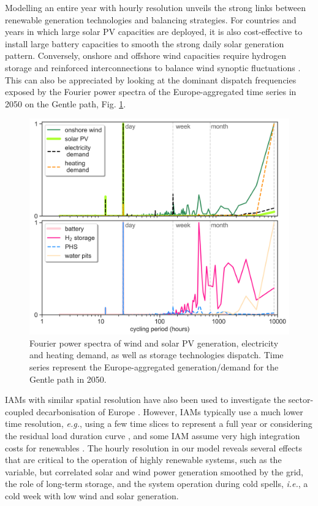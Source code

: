 \documentclass[5p]{elsarticle} %
\begin{document}
Modelling an entire year with hourly resolution unveils the strong links between renewable generation technologies and balancing strategies. For countries and years in which large solar PV capacities are deployed, it is also cost-effective to install large battery capacities to smooth the strong daily solar generation pattern. Conversely, onshore and offshore wind capacities require hydrogen storage and reinforced interconnections to balance wind synoptic fluctuations \cite{Rasmussen_2012, Schlachtberger_2017, Victoria_2019_storage}. %
This can also be appreciated by looking at the dominant dispatch frequencies exposed by the Fourier power spectra of the Europe-aggregated time series in 2050 on the Gentle path, Fig. \ref{fig_Fourier}. \\

\begin{figure}[!h]
\centering
\includegraphics[width=\columnwidth]{figures/Fourier.png}
\caption{Fourier power spectra of wind and solar PV generation, electricity and heating demand, as well as storage technologies dispatch. Time series represent the Europe-aggregated generation/demand for the Gentle path in 2050.} \label{fig_Fourier} 
\end{figure}

IAMs with similar spatial resolution have also been used to investigate the sector-coupled decarbonisation of Europe \cite{in-depth_2018, JRC-EU-TIMES, Creutzig_2017}. However, IAMs typically use a much lower time resolution, \textit{e.g.}, using a few time slices to represent a full year \cite{JRC-EU-TIMES, Loffler_2019, Poncelet_2016, McGlade_2015, Babrowski_2014} or considering the residual load duration curve \cite{Creutzig_2017, Ueckerdt_2017}, and some IAM assume very high integration costs for renewables \cite{Pietzcker_2014}. The hourly resolution in our model reveals several effects that are critical to the operation of highly renewable systems, such as the variable, but correlated solar and wind power generation smoothed by the grid, the role of long-term storage, and the system operation during cold spells, \textsl{i.e.}, a cold week with low wind and solar generation.
\end{document}
